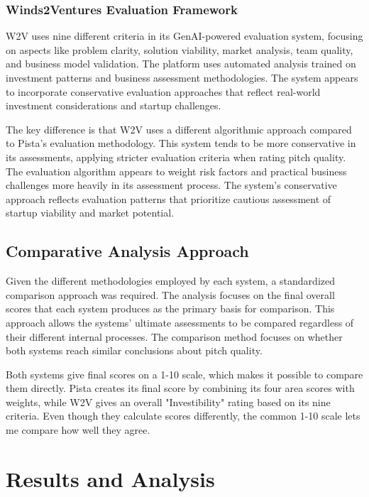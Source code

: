 \subsubsection{Winds2Ventures Evaluation Framework}

W2V uses nine different criteria in its GenAI-powered evaluation system, focusing on aspects like problem clarity, solution viability, market analysis, team quality, and business model validation. The platform uses automated analysis trained on investment patterns and business assessment methodologies. The system appears to incorporate conservative evaluation approaches that reflect real-world investment considerations and startup challenges.

The key difference is that W2V uses a different algorithmic approach compared to Pista's evaluation methodology. This system tends to be more conservative in its assessments, applying stricter evaluation criteria when rating pitch quality. The evaluation algorithm appears to weight risk factors and practical business challenges more heavily in its assessment process. The system's conservative approach reflects evaluation patterns that prioritize cautious assessment of startup viability and market potential.

\subsection{Comparative Analysis Approach}
\label{subsec:methodology-approach}

Given the different methodologies employed by each system, a standardized comparison approach was required. The analysis focuses on the final overall scores that each system produces as the primary basis for comparison. This approach allows the systems' ultimate assessments to be compared regardless of their different internal processes. The comparison method focuses on whether both systems reach similar conclusions about pitch quality.

Both systems give final scores on a 1-10 scale, which makes it possible to compare them directly. Pista creates its final score by combining its four area scores with weights, while W2V gives an overall "Investibility" rating based on its nine criteria. Even though they calculate scores differently, the common 1-10 scale lets me compare how well they agree.

\section{Results and Analysis}
\label{sec:inter-rater-reliability}

